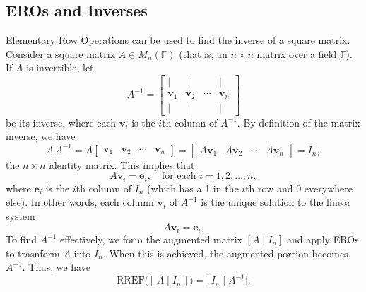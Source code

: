 \documentclass[a4paper, 9pt]{extarticle}
\begin{document}
\subsection{EROs and Inverses}
Elementary Row Operations can be used to find the inverse of a square matrix.  Consider a square matrix $A \in M_n(\mathbb{F})$ (that is, an $n \times n$ matrix over a field $\mathbb{F}$). If $A$ is invertible, let
$$
  A^{-1}
  =
  \begin{bmatrix}
    |            & |            &        & |            \\
    \mathbf{v}_1 & \mathbf{v}_2 & \cdots & \mathbf{v}_n \\
    |            & |            &        & |
  \end{bmatrix}
$$
be its inverse, where each $\mathbf{v}_i$ is the $i$th column of $A^{-1}$. By definition of the matrix inverse, we have
$$
  A \, A^{-1}
  =
  A \begin{bmatrix}
    \mathbf{v}_1 & \mathbf{v}_2 & \cdots & \mathbf{v}_n
  \end{bmatrix}
  =
  \begin{bmatrix}
    A \mathbf{v}_1 & A \mathbf{v}_2 & \cdots & A \mathbf{v}_n
  \end{bmatrix}
  =
  I_n,
$$
the $n \times n$ identity matrix. This implies that
$$
  A \mathbf{v}_i = \mathbf{e}_i, \quad \text{for each } i=1, 2, \ldots, n,
$$
where $\mathbf{e}_i$ is the $i$th column of $I_n$ (which has a 1 in the $i$th row and 0 everywhere else). In other words, each column $\mathbf{v}_i$ of $A^{-1}$ is the unique solution to the linear system
$$
  A \mathbf{v}_i = \mathbf{e}_i.
$$
To find $A^{-1}$ effectively, we form the augmented matrix $[A \mid I_n]$ and apply EROs to trasnform $A$ into $I_n$. When this is achieved, the augmented portion becomes $A^{-1}$. Thus, we have
$$
  \text{RREF}\bigl([\,A \mid I_n\,]\bigr)
  =
  \bigl[\, I_n \mid A^{-1} \bigr].
$$
\end{document}
